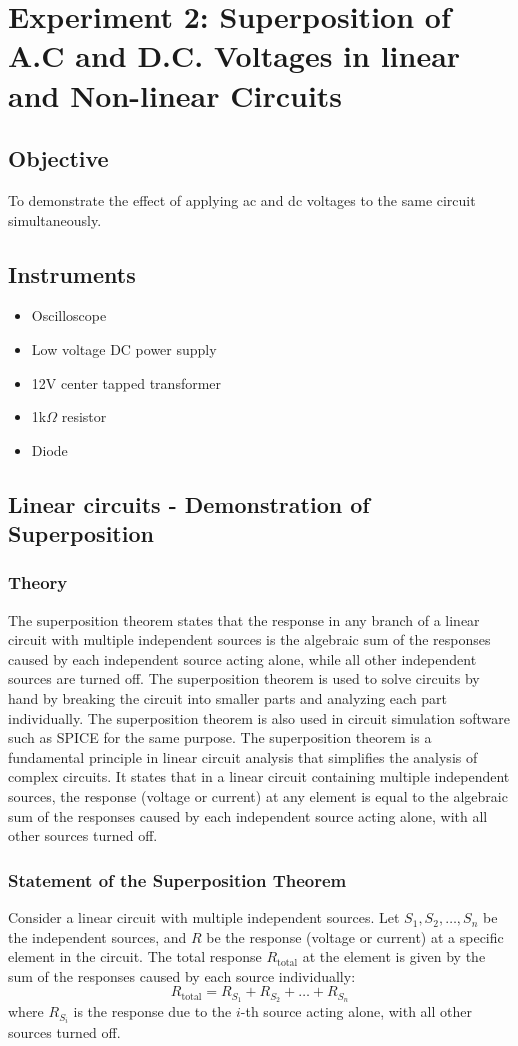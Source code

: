 \newpage
\section{Experiment 2: Superposition of A.C and D.C. Voltages in linear and Non-linear Circuits}
\subsection{Objective}
To demonstrate the effect of applying ac and dc voltages to the same circuit simultaneously.

\subsection {Instruments}
\begin{itemize}
\item Oscilloscope
\item Low voltage DC power supply
\item 12V center tapped transformer
\item 1k$\Omega$ resistor
\item Diode
\end{itemize}

\subsection{Linear circuits - Demonstration of Superposition}
\subsubsection{Theory}
The superposition theorem states that the response in any branch of a linear circuit with multiple independent sources is the algebraic sum of the responses caused by each independent source acting alone, while all other independent sources are turned off. The superposition theorem is used to solve circuits by hand by breaking the circuit into smaller parts and analyzing each part individually. The superposition theorem is also used in circuit simulation software such as SPICE for the same purpose.
The superposition theorem is a fundamental principle in linear circuit analysis that simplifies the analysis of complex circuits. It states that in a linear circuit containing multiple independent sources, the response (voltage or current) at any element is equal to the algebraic sum of the responses caused by each independent source acting alone, with all other sources turned off.
\subsubsection{Statement of the Superposition Theorem}
Consider a linear circuit with multiple independent sources. Let \(S_1, S_2, \ldots, S_n\) be the independent sources, and \(R\) be the response (voltage or current) at a specific element in the circuit.
The total response \(R_{\text{total}}\) at the element is given by the sum of the responses caused by each source individually:
\[
R_{\text{total}} = R_{S_1} + R_{S_2} + \ldots + R_{S_n}
\]
where \(R_{S_i}\) is the response due to the \(i\)-th source acting alone, with all other sources turned off.
